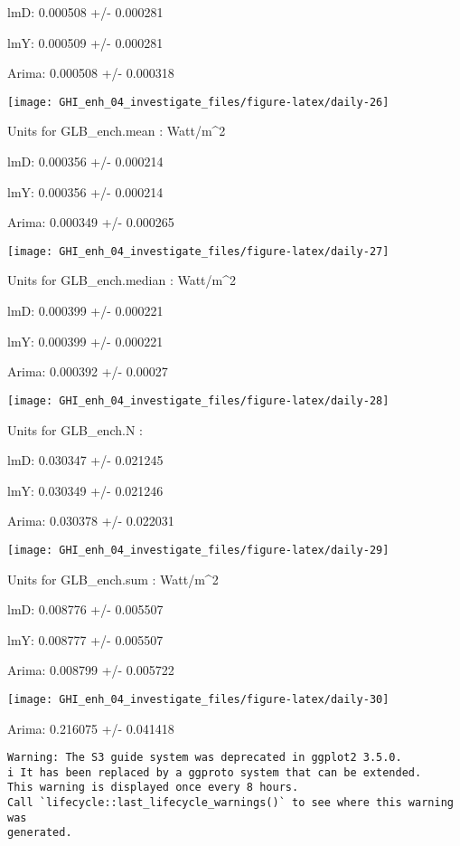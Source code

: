 \documentclass[
  10pt,
  a4paper,oneside]{article}
\begin{document}
lmD: 0.000508 +/- 0.000281

lmY: 0.000509 +/- 0.000281

Arima: 0.000508 +/- 0.000318

\begin{center}\texttt{[image: GHI\_enh\_04\_investigate\_files/figure-latex/daily-26]} \end{center}

Units for GLB\_ench.mean : Watt/m\^{}2

lmD: 0.000356 +/- 0.000214

lmY: 0.000356 +/- 0.000214

Arima: 0.000349 +/- 0.000265

\begin{center}\texttt{[image: GHI\_enh\_04\_investigate\_files/figure-latex/daily-27]} \end{center}

Units for GLB\_ench.median : Watt/m\^{}2

lmD: 0.000399 +/- 0.000221

lmY: 0.000399 +/- 0.000221

Arima: 0.000392 +/- 0.00027

\begin{center}\texttt{[image: GHI\_enh\_04\_investigate\_files/figure-latex/daily-28]} \end{center}

Units for GLB\_ench.N :

lmD: 0.030347 +/- 0.021245

lmY: 0.030349 +/- 0.021246

Arima: 0.030378 +/- 0.022031

\begin{center}\texttt{[image: GHI\_enh\_04\_investigate\_files/figure-latex/daily-29]} \end{center}

Units for GLB\_ench.sum : Watt/m\^{}2

lmD: 0.008776 +/- 0.005507

lmY: 0.008777 +/- 0.005507

Arima: 0.008799 +/- 0.005722

\begin{center}\texttt{[image: GHI\_enh\_04\_investigate\_files/figure-latex/daily-30]} \end{center}

Arima: 0.216075 +/- 0.041418

\begin{verbatim}
Warning: The S3 guide system was deprecated in ggplot2 3.5.0.
i It has been replaced by a ggproto system that can be extended.
This warning is displayed once every 8 hours.
Call `lifecycle::last_lifecycle_warnings()` to see where this warning was
generated.
\end{verbatim}
\end{document}
